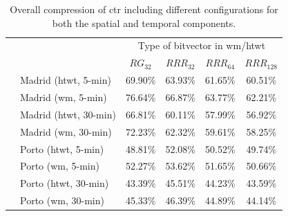 	\begin{table}[ht]
	
	\begin{center}
	\caption{Overall compression of \acrshort{ctr} including different configurations for both the spatial and temporal components.}
	\label{table:ctr:exp:space:ctr}
	
	  \begin{tabular}{|c|l|*{4}{c}|}
	  \cline{3-6}
	  \multicolumn{2}{c|}{} & \multicolumn{4}{c|}{Type of bitvector in \gls{wm}/\gls{htwt}} \\

	  \multicolumn{2}{c|}{}     &$RG_{32}$& $RRR_{32}$& $RRR_{64}$&$RRR_{128}$ \\
	  \hline
	  \multirow{8}{*}{\STAB{\rotatebox[origin=c]{90}{$t_{\Psi}=32$}}}
	   & Madrid (\gls{htwt}, 5-min)  & 69.90\% &   63.93\% &   61.65\% &   60.51\% \\
	   & Madrid (\gls{wm}, 5-min)     & 76.64\% &   66.87\% &   63.77\% &   62.21\% \\
	   & Madrid (\gls{htwt}, 30-min) & 66.81\% &   60.11\% &   57.99\% &   56.92\% \\
	   & Madrid (\gls{wm}, 30-min)    & 72.23\% &   62.32\% &   59.61\% &   58.25\% \\
	  \cline{2-6}
	   & Porto (\gls{htwt}, 5-min)   & 48.81\% &   52.08\% &   50.52\% &   49.74\% \\
	   & Porto (\gls{wm}, 5-min)      & 52.27\% &   53.62\% &   51.65\% &   50.66\% \\
	   & Porto (\gls{htwt}, 30-min)  & 43.39\% &   45.51\% &   44.23\% &   43.59\% \\
	   & Porto (\gls{wm}, 30-min)     & 45.33\% &   46.39\% &   44.89\% &   44.14\% \\
	  \hline
	  


\end{tabular}
\end{center}
\end{table}
